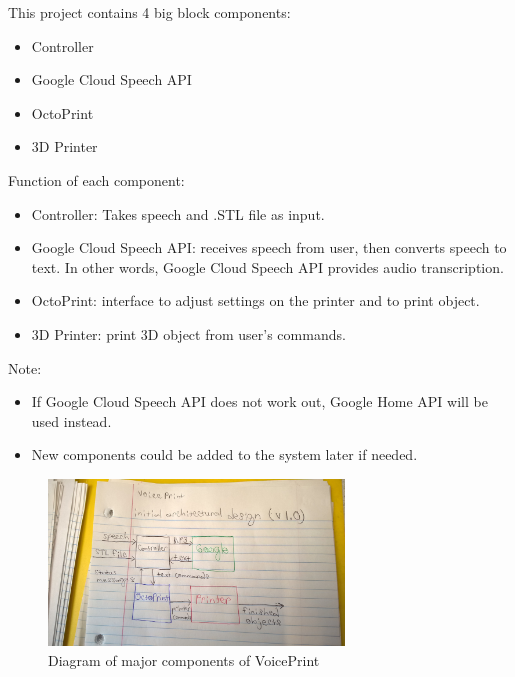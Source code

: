 This project contains 4 big block components:
\begin{itemize}
    \item Controller 
    \item Google Cloud Speech API
    \item OctoPrint
    \item 3D Printer
\end{itemize}

Function of each component:

\begin{itemize}
    \item Controller: Takes speech and .STL file as input.
    \item Google Cloud Speech API: receives speech from user, then converts speech to text. 
In other words, Google Cloud Speech API provides audio transcription.
    \item OctoPrint: interface to adjust settings on the printer and to print object.
    \item 3D Printer: print 3D object from user's commands.
\end{itemize}

Note:

\begin{itemize}
    \item If Google Cloud Speech API does not work out, Google Home API will be used instead.
    \item New components could be added to the system later if needed.
\end{itemize}

\begin{figure}[h!]
	\centering
   	\includegraphics[width=0.7\textwidth]{images/Diagram.jpg}
   	    \caption{Diagram of major components of VoicePrint}
\end{figure}


